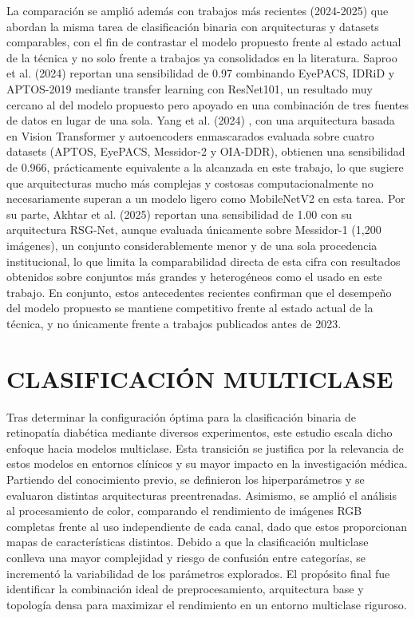 La comparación se amplió además con trabajos más recientes (2024-2025) que abordan la
misma tarea de clasificación binaria con arquitecturas y datasets comparables,
con el fin de contrastar el modelo propuesto frente al estado actual de la técnica y no
solo frente a trabajos ya consolidados en la literatura. Saproo et al. (2024)
 reportan una
sensibilidad de 0.97 combinando EyePACS, IDRiD y APTOS-2019 mediante transfer learning con
ResNet101, un resultado muy cercano al del modelo propuesto pero apoyado en una
combinación de tres fuentes de datos en lugar de una sola. Yang et al. (2024)
, con una
arquitectura basada en Vision Transformer y autoencoders enmascarados evaluada sobre
cuatro datasets (APTOS, EyePACS, Messidor-2 y OIA-DDR), obtienen una sensibilidad de 0.966,
prácticamente equivalente a la alcanzada en este trabajo, lo que sugiere que arquitecturas
mucho más complejas y costosas computacionalmente no necesariamente superan a un modelo
ligero como MobileNetV2 en esta tarea. Por su parte, Akhtar et al. (2025)
 reportan una
sensibilidad de 1.00 con su arquitectura RSG-Net, aunque evaluada únicamente sobre
Messidor-1 (1,200 imágenes), un conjunto considerablemente menor y de una sola procedencia
institucional, lo que limita la comparabilidad directa de esta cifra con resultados
obtenidos sobre conjuntos más grandes y heterogéneos como el usado en este trabajo. En
conjunto, estos antecedentes recientes confirman que el desempeño del modelo propuesto se
mantiene competitivo frente al estado actual de la técnica, y no únicamente frente a
trabajos publicados antes de 2023.
\section{CLASIFICACIÓN MULTICLASE}

Tras determinar la configuración óptima para la clasificación binaria de retinopatía
diabética mediante diversos experimentos, este estudio escala dicho enfoque hacia modelos
multiclase. Esta transición se justifica por la relevancia de estos modelos en entornos
clínicos y su mayor impacto en la investigación médica. Partiendo del conocimiento previo,
se definieron los hiperparámetros y se evaluaron distintas arquitecturas preentrenadas.
Asimismo, se amplió el análisis al procesamiento de color, comparando el rendimiento de
imágenes RGB completas frente al uso independiente de cada canal, dado que estos
proporcionan mapas de características distintos. Debido a que la clasificación multiclase
conlleva una mayor complejidad y riesgo de confusión entre categorías, se incrementó la
variabilidad de los parámetros explorados. El propósito final fue identificar la
combinación ideal de preprocesamiento, arquitectura base y topología densa para maximizar
el rendimiento en un entorno multiclase riguroso.

